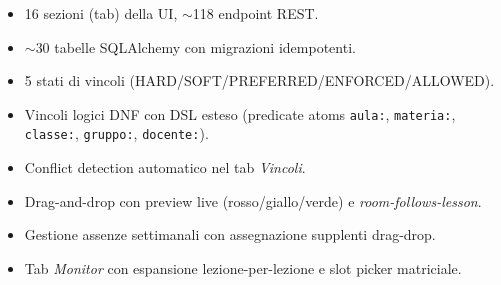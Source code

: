 \begin{itemize}
  \item 16 sezioni (tab) della UI, $\sim$118 endpoint REST.
  \item $\sim$30 tabelle SQLAlchemy con migrazioni idempotenti.
  \item 5 stati di vincoli (HARD/SOFT/PREFERRED/ENFORCED/ALLOWED).
  \item Vincoli logici DNF con DSL esteso (predicate atoms
        \texttt{aula:}, \texttt{materia:}, \texttt{classe:},
        \texttt{gruppo:}, \texttt{docente:}).
  \item Conflict detection automatico nel tab \emph{Vincoli}.
  \item Drag-and-drop con preview live (rosso/giallo/verde) e
        \emph{room-follows-lesson}.
  \item Gestione assenze settimanali con assegnazione supplenti
        drag-drop.
  \item Tab \emph{Monitor} con espansione lezione-per-lezione e
        slot picker matriciale.
\end{itemize}

